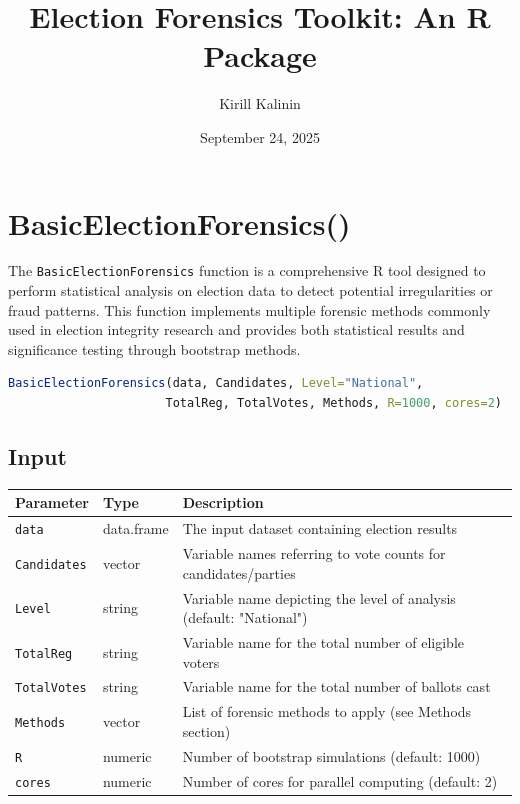 \documentclass{article}
\title{Election Forensics Toolkit: An R Package}
\author{Kirill Kalinin}
\date{September 24, 2025}
\begin{document}
\maketitle

\section{BasicElectionForensics()}

The \texttt{BasicElectionForensics} function is a comprehensive R tool designed to perform statistical analysis on election data to detect potential irregularities or fraud patterns. This function implements multiple forensic methods commonly used in election integrity research and provides both statistical results and significance testing through bootstrap methods.

\begin{lstlisting}[language=R]
BasicElectionForensics(data, Candidates, Level="National", 
                      TotalReg, TotalVotes, Methods, R=1000, cores=2)
\end{lstlisting}

\subsection{Input}
\begin{longtable}{p{3cm}p{3cm}p{8cm}}
\toprule
\textbf{Parameter} & \textbf{Type} & \textbf{Description} \\
\midrule
\texttt{data} & data.frame & The input dataset containing election results \\
\texttt{Candidates} & vector & Variable names referring to vote counts for candidates/parties \\
\texttt{Level} & string & Variable name depicting the level of analysis (default: "National") \\
\texttt{TotalReg} & string & Variable name for the total number of eligible voters \\
\texttt{TotalVotes} & string & Variable name for the total number of ballots cast \\
\texttt{Methods} & vector & List of forensic methods to apply (see Methods section) \\
\texttt{R} & numeric & Number of bootstrap simulations (default: 1000) \\
\texttt{cores} & numeric & Number of cores for parallel computing (default: 2) \\
\bottomrule
\end{longtable}
\end{document}
